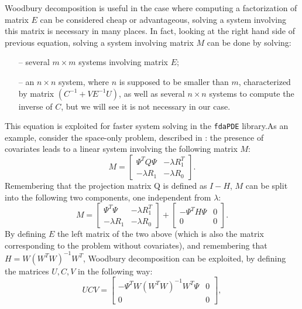 Woodbury decomposition is useful in the case where computing a factorization of
matrix $E$ can be considered cheap or advantageous, \ie solving a system
involving this matrix is necessary in many places. In fact, looking at the
right hand side of previous equation, solving a system involving matrix $M$ can
be done by solving:
\begin{itemize}
	\item[--]several $m \times m$ systems involving matrix $E$;
	\item[--]an $n \times n$ system, where $n$ is supposed to be smaller than $m$, characterized by matrix
	$ \left( C^{-1} + V E^{-1}U \right)$, as well as several $n \times n$ systems to compute the
	inverse of $C$, but we will see it is not necessary in our case.
\end{itemize}
This equation is exploited for faster system solving in the
\verb|fdaPDE| library.\newline As an example, consider the space-only problem,
described \eg in \cite{sangalli1}: the presence of covariates leads to a linear
system involving the following matrix $M$:
\begin{equation*}
	M =
	\begin{bmatrix}
		\Psi^TQ\Psi  & -\lambda R_1^T \\
		-\lambda R_1 & -\lambda R_0
	\end{bmatrix}
	.
\end{equation*} Remembering that the projection matrix Q is defined as $I-H$, $M$
can be split into the following two components, one independent from $\lambda$:
\begin{equation*}
	M =
	\begin{bmatrix}
		\Psi^T\Psi   & -\lambda R_1^T \\
		-\lambda R_1 & -\lambda R_0
	\end{bmatrix}
	+
	\begin{bmatrix}
		-\Psi^TH\Psi & 0 \\
		0            & 0
	\end{bmatrix}
	.
\end{equation*} By defining $E$ the left matrix of the two above (which is also the
matrix corresponding to the problem without covariates), and remembering that
$H = W\left(W^TW\right)^{-1}W^T$, Woodbury decomposition can be exploited, by
defining the matrices $U, C, V$ in the following way:
\begin{equation*}
	UCV=
	\begin{bmatrix}
		-\Psi^TW\left(W^TW\right)^{-1}W^T\Psi & 0 \\
		0                                     & 0
	\end{bmatrix}
	,
\end{equation*}
